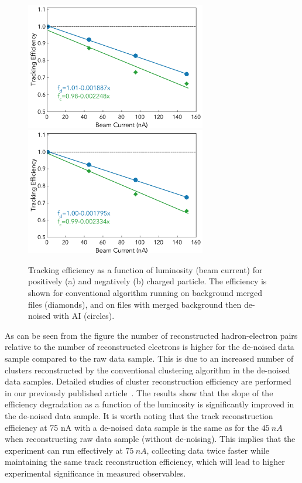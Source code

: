 \begin{figure}[!h]
\begin{center}
 \includegraphics[width=3.1in]{images/figure_lscan_pos.pdf}
 \includegraphics[width=3.1in]{images/figure_lscan_neg.pdf}
\caption {Tracking efficiency as a function of luminosity (beam current) for positively (a) and negatively (b) charged particle.  The efficiency is shown for
conventional algorithm running on background merged files (diamonds), and on files with merged background then de-noised with AI (circles).}
 \label{lscan::conv_dn}
 \end{center}
\end{figure}

As can be seen from the figure the number of reconstructed hadron-electron pairs relative to the number of reconstructed electrons is higher for the de-noised data sample compared to the raw data sample. This is due to an increased number of clusters reconstructed by the conventional clustering algorithm in the de-noised data samples. Detailed studies of cluster reconstruction efficiency are performed 
in our previously published article~\cite{Thomadakis:2022zcd}. 
The results show that the slope of the efficiency degradation as a function of the luminosity is significantly improved in the de-noised data sample. 
It is worth noting that the track reconstruction efficiency at 75 nA with a de-noised data sample is the same as for the 
$45~nA$ when reconstructing raw data sample (without de-noising). This implies that the experiment can run effectively at $75~nA$, collecting data 
twice faster while maintaining the same track reconstruction efficiency, which will lead to higher experimental significance in measured observables. 

